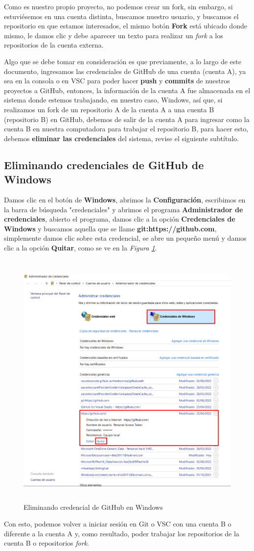 Como es nuestro propio proyecto, no podemos crear un fork, sin embargo, si estuviésemos en una cuenta distinta, buscamos nuestro usuario, y buscamos el repositorio en que estamos interesados, el mismo botón \textbf{Fork} está ubicado donde mismo, le damos clic y debe aparecer un texto para realizar un \textit{fork} a los repositorios de la cuenta externa.

Algo que se debe tomar en consideración es que previamente, a lo largo de este documento, ingresamos las credenciales de GitHub de una cuenta (cuenta A), ya sea en la consola o en VSC para poder hacer \textbf{push} y \textbf{commits} de nuestros proyectos a GitHub, entonces, la información de la cuenta A fue almacenada en el sistema donde estemos trabajando, en nuestro caso, Windows, así que, si realizamos un fork de un repositorio A de la cuenta A a una cuenta B (repositorio B) en GitHub, debemos de salir de la cuenta A para ingresar como la cuenta B en nuestra computadora para trabajar el repositorio B, para hacer esto, debemos \textbf{eliminar las credenciales} del sistema, revise el siguiente subtítulo.


\subsection{Eliminando credenciales de GitHub de Windows}
Damos clic en el botón de \textbf{Windows}, abrimos la \textbf{Configuración}, escribimos en la barra de búsqueda "credenciales" y abrimos el programa \textbf{Administrador de credenciales}, abierto el programa, damos clic a la opción \textbf{Credenciales de Windows} y buscamos aquella que se llame \textbf{git:https://github.com}, simplemente damos clic sobre esta credencial, se abre un pequeño menú y damos clic a la opción \textbf{Quitar}, como se ve en la \textit{Figura \ref{fig: 38}}.
\begin{figure}[H]
    \centering
    \caption{Eliminando credencial de GitHub en Windows}
    \label{fig: 38}
    \includegraphics[height=13cm]{capturas/credencial.png}
\end{figure}

Con esto, podemos volver a iniciar sesión en Git o VSC con una cuenta B o diferente a la cuenta A y, como resultado, poder trabajar los repositorios de la cuenta B o repositorios \textit{fork}.